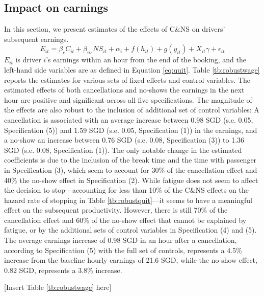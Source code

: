 \documentclass[reviewmode]{restat}
\begin{document}
\subsection{Impact on earnings}
In this section, we present estimates of the effects of C\&NS on drivers' subsequent earnings.
\begin{equation}
\label{eq:outcomes}
E_{it} = \beta_c C_{it} + \beta_{ns} {NS}_{it} + \alpha_i + f(h_{it}) + g(y_{it}) + X_{it}\gamma  + \epsilon_{it}
\end{equation}
$E_{it}$ is driver $i$'s earnings within an hour from the end of the booking, and the left-hand side variables are as defined in Equation \ref{eq:quit}. Table \ref{tb:robustwage} reports the estimates for various sets of fixed effects and control variables. The estimated effects of both cancellations and no-shows the earnings in the next hour are positive and significant across all five specifications. The magnitude of the effects are also robust to the inclusion of additional set of control variables: A cancellation is associated with an average increase between 0.98 SGD (s.e. 0.05, Specification (5)) and 1.59 SGD (s.e. 0.05, Specification (1)) in the earnings, and a no-show an increase between 0.76 SGD (s.e. 0.08, Specification (3)) to 1.36 SGD (s.e. 0.08, Specification (1)). The only notable change in the estimated coefficients is due to the inclusion of the break time and the time with passenger in Specification (3), which seem to account for 30\% of the cancellation effect and 40\% the no-show effect in Specification (2). While fatigue does not seem to affect the decision to stop---accounting for less than 10\% of the C\&NS effects on the hazard rate of stopping in Table \ref{tb:robustquit}---it seems to have a meaningful effect on the subsequent productivity. However, there is still 70\% of the cancellation effect and 60\% of the no-show effect that cannot be explained by fatigue, or by the additional sets of control variables in Specification (4) and (5). The average earnings increase of 0.98 SGD in an hour after a cancellation, according to Specification (5) with the full set of controls, represents a 4.5\% increase from the baseline hourly earnings of 21.6 SGD, while the no-show effect, 0.82 SGD, represents a 3.8\% increase.



\begin{center}
	[Insert Table \ref{tb:robustwage} here]
\end{center}

\end{document}
